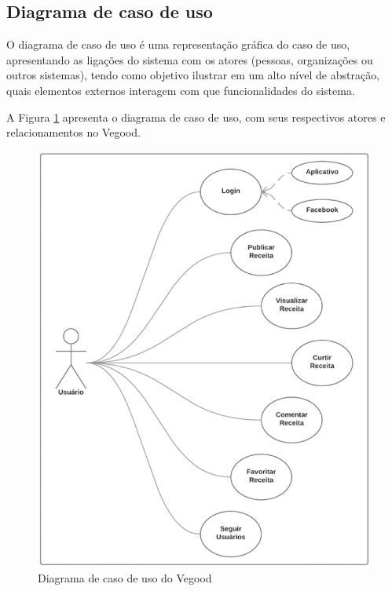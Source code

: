 \subsection{Diagrama de caso de uso} \label{sec:vegood:diagrama-de-caso-de-uso}

O diagrama de caso de uso é uma representação gráfica do caso de uso, apresentando as ligações do sistema com os atores (pessoas, organizações ou outros sistemas), tendo como objetivo ilustrar em um alto nível de abstração, quais elementos externos interagem com que funcionalidades do sistema. 

A Figura \ref{fig:diagrama-de-caso-de-uso} apresenta o diagrama de caso de uso, com seus respectivos atores e relacionamentos no Vegood.


\begin{figure}[H]
	\caption{\label{fig:diagrama-de-caso-de-uso}Diagrama de caso de uso do Vegood}
	\centering
	\includegraphics[scale=0.7]{imagens/figura8.png}
\end{figure}


